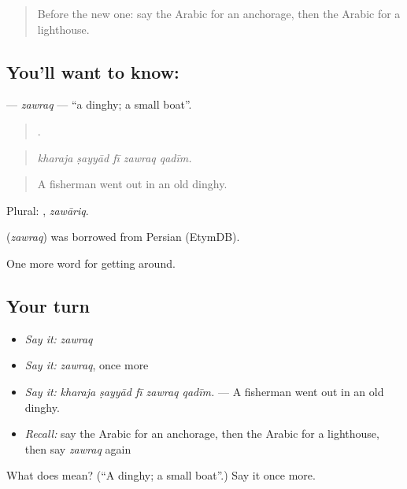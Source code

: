 \label{lesson:AR-C430-zawraq}



\begin{quote}
Before the new one: say the Arabic for an anchorage, then the Arabic for a lighthouse.
\end{quote}

\subsection*{You'll want to know: }
\textbf{} — \emph{zawraq} — \textquotedblleft{}a dinghy; a small boat\textquotedblright{}.

\begin{quote}
    .
\end{quote}

\begin{quote}
\emph{kharaja ṣayyād fī zawraq qadīm.}
\end{quote}

\begin{quote}
A fisherman went out in an old dinghy.
\end{quote}

Plural: , \emph{zawāriq}.

\begin{cousinweb}
\textbf{} (\emph{zawraq}) was borrowed from Persian (EtymDB).
\end{cousinweb}

\begin{grammarlens}[title={What you've built}]
One more word for getting around.
\end{grammarlens}

\subsection*{Your turn}
\begin{itemize}
\raggedright
  \item \emph{Say it:} \emph{zawraq}
  \item \emph{Say it:} \emph{zawraq}, once more
  \item \emph{Say it:} \emph{kharaja ṣayyād fī zawraq qadīm.} — A fisherman went out in an old dinghy.
  \item \emph{Recall:} say the Arabic for an anchorage, then the Arabic for a lighthouse, then say \emph{zawraq} again
\end{itemize}

\begin{tcolorbox}[breakable,colback=teal!4,colframe=teal!35!black,title={Before you move on}]
What does  mean? (\textquotedblleft{}A dinghy; a small boat\textquotedblright{}.) Say it once more.
\end{tcolorbox}
